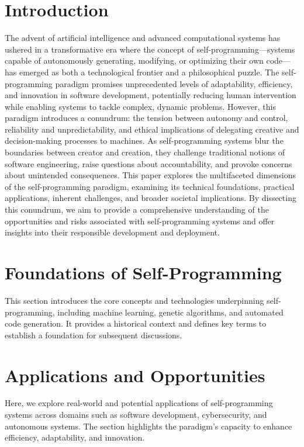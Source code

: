 \documentclass[]{article}
\begin{document}
\section{Introduction}
The advent of artificial intelligence and advanced computational systems has ushered in a transformative era where the concept of self-programming—systems capable of autonomously generating, modifying, or optimizing their own code—has emerged as both a technological frontier and a philosophical puzzle. The self-programming paradigm promises unprecedented levels of adaptability, efficiency, and innovation in software development, potentially reducing human intervention while enabling systems to tackle complex, dynamic problems. However, this paradigm introduces a conundrum: the tension between autonomy and control, reliability and unpredictability, and ethical implications of delegating creative and decision-making processes to machines. As self-programming systems blur the boundaries between creator and creation, they challenge traditional notions of software engineering, raise questions about accountability, and provoke concerns about unintended consequences. This paper explores the multifaceted dimensions of the self-programming paradigm, examining its technical foundations, practical applications, inherent challenges, and broader societal implications. By dissecting this conundrum, we aim to provide a comprehensive understanding of the opportunities and risks associated with self-programming systems and offer insights into their responsible development and deployment.

\section{Foundations of Self-Programming}
This section introduces the core concepts and technologies underpinning self-programming, including machine learning, genetic algorithms, and automated code generation. It provides a historical context and defines key terms to establish a foundation for subsequent discussions.

\section{Applications and Opportunities}
Here, we explore real-world and potential applications of self-programming systems across domains such as software development, cybersecurity, and autonomous systems. The section highlights the paradigm’s capacity to enhance efficiency, adaptability, and innovation.
\end{document}
